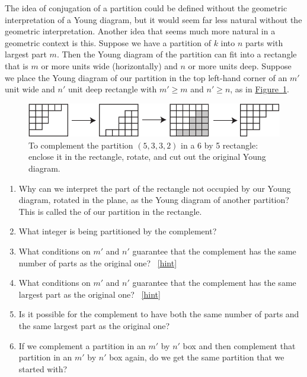 \documentclass{book}
\begin{document}
\setcounter{project}{308}
\addtocounter{project}{-1}
\begin{activity}[]\label{activity-301}
\hypertarget{p-1568}{}%
The idea of conjugation of a partition could be defined without the geometric interpretation of a Young diagram, but it would seem far less natural without the geometric interpretation. Another idea that seems much more natural in a geometric context is this. Suppose we have a partition of \(k\) into \(n\) parts with largest part \(m\). Then the Young diagram of the partition can fit into a rectangle that is \(m\) or more units wide (horizontally) and \(n\) or more units deep. Suppose we place the Young diagram of our partition in the top left-hand corner of an \(m'\) unit wide and \(n'\) unit deep rectangle with \(m'\ge m\) and \(n' \ge n\), as in \hyperref[complementpartition]{Figure~\ref{complementpartition}}.%
\begin{figure}
\centering
\includegraphics[width=0.7\linewidth]{images/complementpartition}
\caption{To complement the partition \((5,3,3,2)\) in a 6 by 5 rectangle: enclose it in the rectangle, rotate, and cut out the original Young diagram.\label{complementpartition}}
\end{figure}
\begin{enumerate}[font=\bfseries,label=(\alph*),ref=\alph*]
\item\label{task-266} \hypertarget{p-1569}{}%
Why can we interpret the part of the rectangle not occupied by our Young diagram, rotated in the plane, as the Young diagram of another partition? This is called the  of our partition in the rectangle.%
\item\label{task-267} \hypertarget{p-1571}{}%
What integer is being partitioned by the complement?%
\item\label{task-268} \hypertarget{p-1573}{}%
What conditions on \(m'\) and \(n'\) guarantee that the complement has the same number of parts as the original one?%
~\hfill{\tiny\hyperlink{a-308.c}{[hint]}\hypertarget{q-308.c}{}}\item\label{task-269} \hypertarget{p-1576}{}%
What conditions on \(m'\) and \(n'\) guarantee that the complement has the same largest part as the original one?%
~\hfill{\tiny\hyperlink{a-308.d}{[hint]}\hypertarget{q-308.d}{}}\item\label{task-270} \hypertarget{p-1579}{}%
Is it possible for the complement to have both the same number of parts and the same largest part as the original one?%
\item\label{task-271} \hypertarget{p-1581}{}%
If we complement a partition in an \(m'\) by \(n'\) box and then complement that partition in an \(m'\) by \(n'\) box again, do we get the same partition that we started with?%
\end{enumerate}
\end{activity}
\end{document}
